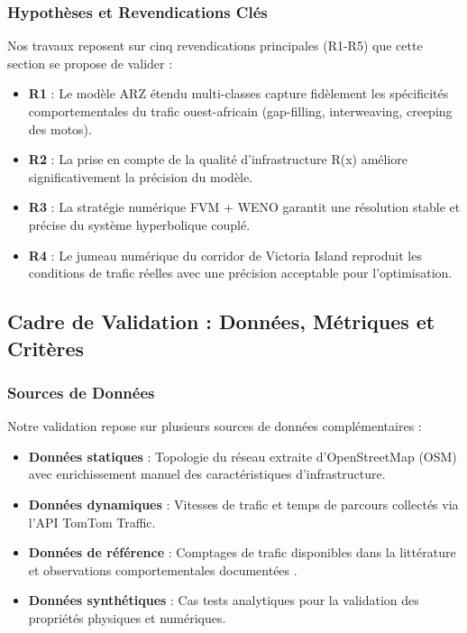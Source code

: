 \subsubsection{Hypothèses et Revendications Clés}
\label{subsec:hypotheses_revendications}

Nos travaux reposent sur cinq revendications principales (R1-R5) que cette section se propose de valider :

\begin{itemize}
    \item \textbf{R1} : Le modèle ARZ étendu multi-classes capture fidèlement les spécificités comportementales du trafic ouest-africain (gap-filling, interweaving, creeping des motos).
    \item \textbf{R2} : La prise en compte de la qualité d'infrastructure R(x) améliore significativement la précision du modèle.
    \item \textbf{R3} : La stratégie numérique FVM + WENO garantit une résolution stable et précise du système hyperbolique couplé.
    \item \textbf{R4} : Le jumeau numérique du corridor de Victoria Island reproduit les conditions de trafic réelles avec une précision acceptable pour l'optimisation.
\end{itemize}


\subsection{Cadre de Validation : Données, Métriques et Critères}
\label{sec:cadre_validation}

\subsubsection{Sources de Données}
\label{subsec:sources_donnees}

Notre validation repose sur plusieurs sources de données complémentaires :

\begin{itemize}
    \item \textbf{Données statiques} : Topologie du réseau extraite d'OpenStreetMap (OSM) avec enrichissement manuel des caractéristiques d'infrastructure.
    \item \textbf{Données dynamiques} : Vitesses de trafic et temps de parcours collectés via l'API TomTom Traffic.
    \item \textbf{Données de référence} : Comptages de trafic disponibles dans la littérature \cite{ludi2020traffic} et observations comportementales documentées \cite{gomina2013urban}.
    \item \textbf{Données synthétiques} : Cas tests analytiques pour la validation des propriétés physiques et numériques.
\end{itemize}

